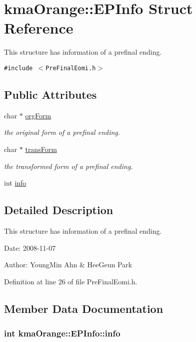 \hypertarget{structkmaOrange_1_1EPInfo}{
\section{kmaOrange::EPInfo Struct Reference}
\label{structkmaOrange_1_1EPInfo}
}
This structure has information of a prefinal ending.  


{\tt \#include $<$PreFinalEomi.h$>$}

\subsection*{Public Attributes}
\begin{CompactItemize}
\item 
char $\ast$ \hyperlink{structkmaOrange_1_1EPInfo_2a8a601311d6bc7a80c0d43a9e515823}{orgForm}
\begin{CompactList}\small\item\em the original form of a prefinal ending. \item\end{CompactList}\item 
char $\ast$ \hyperlink{structkmaOrange_1_1EPInfo_c2ad8a4ce555531304f4a6836bb2d5ff}{transForm}
\begin{CompactList}\small\item\em the transformed form of a prefinal ending. \item\end{CompactList}\item 
int \hyperlink{structkmaOrange_1_1EPInfo_7d998bdc60f7784fecd9e810a98b1ccd}{info}
\end{CompactItemize}


\subsection{Detailed Description}
This structure has information of a prefinal ending. 

\begin{Desc}
\item[Date:]2008-11-07 \end{Desc}
\begin{Desc}
\item[Author:]YoungMin Ahn \& HeeGeun Park \end{Desc}


Definition at line 26 of file PreFinalEomi.h.

\subsection{Member Data Documentation}
\hypertarget{structkmaOrange_1_1EPInfo_7d998bdc60f7784fecd9e810a98b1ccd}{
\subsubsection[{info}]{\setlength{\rightskip}{0pt plus 5cm}int {\bf kmaOrange::EPInfo::info}}}
\label{structkmaOrange_1_1EPInfo_7d998bdc60f7784fecd9e810a98b1ccd}




